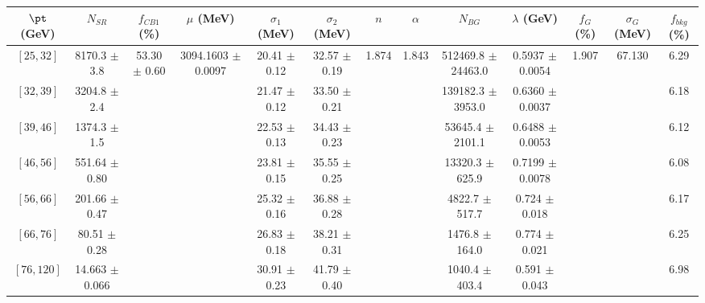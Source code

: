 \begin{tabular}{c||c|c|c|c|c|c|c|c|c|c|c||c}
$\pt$ (GeV) & $N_{SR}$ & $f_{CB1}$ (\%) & $\mu$ (MeV) & $\sigma_1$ (MeV) & $\sigma_2$ (MeV) & $n$ & $\alpha$ & $N_{BG}$ & $\lambda$ (GeV) & $f_G$ (\%) & $\sigma_G$ (MeV) & $f_{bkg}$ (\%) \\
\hline
$[25, 32]$ & 8170.3 $\pm$ 3.8 & \multirow{7}{*}{53.30 $\pm$ 0.60} & \multirow{7}{*}{3094.1603 $\pm$ 0.0097} & 20.41 $\pm$ 0.12 & 32.57 $\pm$ 0.19 & \multirow{7}{*}{1.874} & \multirow{7}{*}{1.843} & 512469.8 $\pm$ 24463.0 & 0.5937 $\pm$ 0.0054 & \multirow{7}{*}{1.907} & \multirow{7}{*}{67.130} & 6.29\\
$[32, 39]$ & 3204.8 $\pm$ 2.4 &  &  & 21.47 $\pm$ 0.12 & 33.50 $\pm$ 0.21 &  &  & 139182.3 $\pm$ 3953.0 & 0.6360 $\pm$ 0.0037 &  &  & 6.18\\
$[39, 46]$ & 1374.3 $\pm$ 1.5 &  &  & 22.53 $\pm$ 0.13 & 34.43 $\pm$ 0.23 &  &  & 53645.4 $\pm$ 2101.1 & 0.6488 $\pm$ 0.0053 &  &  & 6.12\\
$[46, 56]$ & 551.64 $\pm$ 0.80 &  &  & 23.81 $\pm$ 0.15 & 35.55 $\pm$ 0.25 &  &  & 13320.3 $\pm$ 625.9 & 0.7199 $\pm$ 0.0078 &  &  & 6.08\\
$[56, 66]$ & 201.66 $\pm$ 0.47 &  &  & 25.32 $\pm$ 0.16 & 36.88 $\pm$ 0.28 &  &  & 4822.7 $\pm$ 517.7 & 0.724 $\pm$ 0.018 &  &  & 6.17\\
$[66, 76]$ & 80.51 $\pm$ 0.28 &  &  & 26.83 $\pm$ 0.18 & 38.21 $\pm$ 0.31 &  &  & 1476.8 $\pm$ 164.0 & 0.774 $\pm$ 0.021 &  &  & 6.25\\
$[76, 120]$ & 14.663 $\pm$ 0.066 &  &  & 30.91 $\pm$ 0.23 & 41.79 $\pm$ 0.40 &  &  & 1040.4 $\pm$ 403.4 & 0.591 $\pm$ 0.043 &  &  & 6.98\\
\end{tabular}
